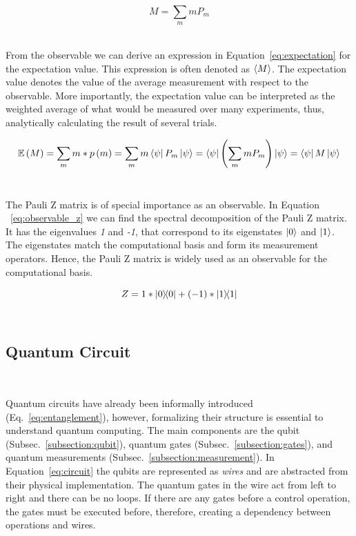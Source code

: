\begin{equation}\label{eq:observable}
  M = \sum_{m}mP_m
\end{equation} \

From the observable we can derive an expression in Equation~\ref{eq:expectation}
for the expectation value. This expression is often denoted as \(\ev{M}\).
The expectation value denotes the value of the average measurement with
respect to the observable. More importantly, the expectation value can be
interpreted as the weighted average of what would be measured over many experiments,
thus, analytically calculating the result of several trials. \ 

\begin{equation}\label{eq:expectation}
  \mathbb{E}\left(M\right) =
  \sum_{m}m*p\left(m\right) =
  \sum_{m}m\bra{\psi}P_m\ket{\psi} =
  \bra{\psi} \left(\sum_{m}mP_m\right) \ket{\psi} =
  \bra{\psi}M\ket{\psi}
\end{equation} \

The Pauli Z matrix is of special importance as an observable. In Equation
~\ref{eq:observable_z} we can find the spectral decomposition of the
Pauli Z matrix. It has the eigenvalues \textit{1} and \textit{-1}, that
correspond to its eigenstates \(\ket{0}\) and \(\ket{1}\). The eigenstates
match the computational basis and form its measurement operators. Hence,
the Pauli Z matrix is widely used as an observable for the computational
basis. \

\begin{equation}\label{eq:observable_z}
  Z = 1 * \ketbra{0}{0} + \left(-1\right) * \ketbra{1}{1}
\end{equation} \



\subsection{Quantum Circuit}\label{subsection:circuit} \

Quantum circuits have already been informally introduced (Eq.~\ref{eq:entanglement}),
however, formalizing their structure is essential to understand quantum computing.
The main components are the qubit (Subsec.~\ref{subsection:qubit}), quantum
gates (Subsec.~\ref{subsection:gates}), and quantum measurements (Subsec.~\ref{subsection:measurement}).
In Equation~\ref{eq:circuit} the qubits are represented as \textit{wires} and are
abstracted from their physical implementation. The quantum gates in the wire act
from left to right and there can be no loops. If there are any gates before a
control operation, the gates must be executed before, therefore, creating a
dependency between operations and wires. \

